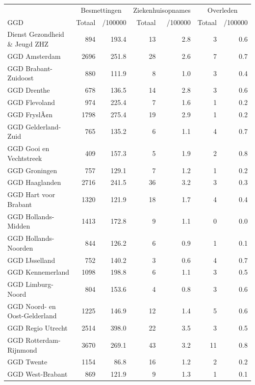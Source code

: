 \documentclass[
  english,
  man,floatsintext]{apa6}
\begin{document}
\begin{table}
\centering\begingroup\fontsize{10}{12}\selectfont

\begin{threeparttable}
\begin{tabular}{lrrrrrr}
\toprule
\multicolumn{1}{c}{ } & \multicolumn{2}{c}{Besmettingen} & \multicolumn{2}{c}{Ziekenhuisopnames} & \multicolumn{2}{c}{Overleden} \\
\cmidrule(l{3pt}r{3pt}){2-3} \cmidrule(l{3pt}r{3pt}){4-5} \cmidrule(l{3pt}r{3pt}){6-7}
GGD & Totaal & /100000 & Totaal & /100000 & Totaal & /100000\\
\midrule
Dienst Gezondheid \& Jeugd ZHZ & 894 & 193.4 & 13 & 2.8 & 3 & 0.6\\
GGD Amsterdam & 2696 & 251.8 & 28 & 2.6 & 7 & 0.7\\
GGD Brabant-Zuidoost & 880 & 111.9 & 8 & 1.0 & 3 & 0.4\\
GGD Drenthe & 678 & 136.5 & 14 & 2.8 & 3 & 0.6\\
GGD Flevoland & 974 & 225.4 & 7 & 1.6 & 1 & 0.2\\
GGD FryslÃ¢n & 1798 & 275.4 & 19 & 2.9 & 1 & 0.2\\
GGD Gelderland-Zuid & 765 & 135.2 & 6 & 1.1 & 4 & 0.7\\
GGD Gooi en Vechtstreek & 409 & 157.3 & 5 & 1.9 & 2 & 0.8\\
GGD Groningen & 757 & 129.1 & 7 & 1.2 & 1 & 0.2\\
GGD Haaglanden & 2716 & 241.5 & 36 & 3.2 & 3 & 0.3\\
GGD Hart voor Brabant & 1320 & 121.9 & 18 & 1.7 & 4 & 0.4\\
GGD Hollands-Midden & 1413 & 172.8 & 9 & 1.1 & 0 & 0.0\\
GGD Hollands-Noorden & 844 & 126.2 & 6 & 0.9 & 1 & 0.1\\
GGD IJsselland & 752 & 140.2 & 3 & 0.6 & 4 & 0.7\\
GGD Kennemerland & 1098 & 198.8 & 6 & 1.1 & 3 & 0.5\\
GGD Limburg-Noord & 804 & 153.6 & 4 & 0.8 & 3 & 0.6\\
GGD Noord- en Oost-Gelderland & 1225 & 146.9 & 12 & 1.4 & 5 & 0.6\\
GGD Regio Utrecht & 2514 & 398.0 & 22 & 3.5 & 3 & 0.5\\
GGD Rotterdam-Rijnmond & 3670 & 269.1 & 43 & 3.2 & 11 & 0.8\\
GGD Twente & 1154 & 86.8 & 16 & 1.2 & 2 & 0.2\\
GGD West-Brabant & 869 & 121.9 & 9 & 1.3 & 1 & 0.1\\

\end{tabular}
\end{threeparttable}
\end{table}
\end{document}
